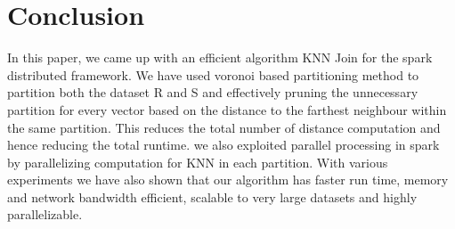 \chapter{Conclusion} \label{chap:conclusion}

In this paper, we came up with an efficient algorithm KNN Join for the
spark distributed framework. We have used voronoi based partitioning
method to partition both the dataset R and S and effectively pruning
the unnecessary partition for every vector based on the distance to
the farthest neighbour within the same partition. This reduces the
total number of distance computation and hence reducing the total runtime.
we also exploited parallel processing in spark by parallelizing
computation for KNN in each partition. With various experiments we
have also shown that our algorithm has faster run time, memory and
network bandwidth efficient, scalable to very large datasets and
highly parallelizable.
